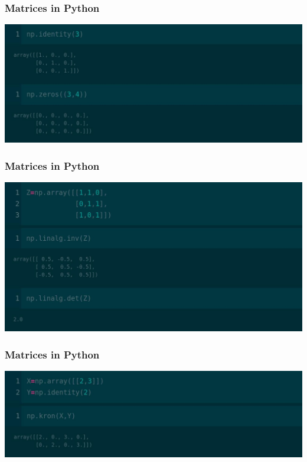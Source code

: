 \documentclass[12pt,aspectratio=169]{beamer}
\begin{document}
\begin{frame}
\frametitle{Matrices in Python}
\begin{center}
\includegraphics[scale=0.3]{mat3}
\end{center}
\end{frame}

\begin{frame}
\frametitle{Matrices in Python}
\begin{center}
\includegraphics[scale=0.3]{mat4}
\end{center}
\end{frame}

\begin{frame}
\frametitle{Matrices in Python}
\begin{center}
\includegraphics[scale=0.3]{mat5}
\end{center}
\end{frame}
\end{document}

